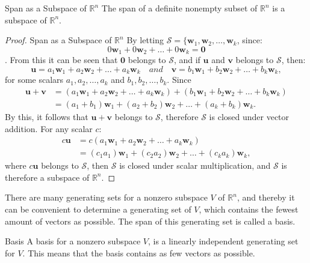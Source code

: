 \begin{theorem}{Span as a Subspace of $\mathbb{R}^n$}
The span of a definite nonempty subset of $\mathbb{R}^n$ is a subspace of $\mathbb{R}^n$.
\cite[231]{LiAl}
\end{theorem}

\begin{proof}{Span as a Subspace of $\mathbb{R}^n$}
    By letting $\mathcal{S} = \{\mathbf{w}_1, \mathbf{w}_2, \hdots, \mathbf{w}_k$, since:
    $$0\mathbf{w}_1 + 0\mathbf{w}_2 + \hdots + 0\mathbf{w}_k = \mathbf{0}$$.
    From this it can be seen that $\mathbf{0}$ belongs to $\mathcal{S}$, and if $\mathbf{u}$ and $\mathbf{v}$ belongs to $\mathcal{S}$, then:
    $$\mathbf{u} = a_1\mathbf{w}_1 + a_2 \mathbf{w}_2 + \hdots + a_k\mathbf{w}_k \quad and \quad \mathbf{v} = b_1\mathbf{w}_1 + b_2 \mathbf{w}_2 + \hdots + b_k\mathbf{w}_k,$$
    for some scalars $a_1, a_2, \hdots, a_k$ and $b_1, b_2, \hdots, b_k$. Since 
    \begin{align*}
     \mathbf{u}+\mathbf{v} &= (a_1\mathbf{w}_1 + a_2 \mathbf{w}_2 + \hdots + a_k\mathbf{w}_k) + (b_1\mathbf{w}_1 + b_2 \mathbf{w}_2 + \hdots + b_k\mathbf{w}_k)\\ 
     &= (a_1+b_1)\mathbf{w}_1 + (a_2+b_2)\mathbf{w}_2 + \hdots + (a_k+b_k)\mathbf{w}_k.
     \end{align*}
     By this, it follows that $\mathbf{u}+\mathbf{v}$ belongs to $\mathcal{S}$, therefore $\mathcal{S}$ is closed under vector addition. For any scalar $c$:
     \begin{align*}
         c\mathbf{u} &= c(a_1\mathbf{w}_1 + a_2 \mathbf{w}_2 + \hdots + a_k\mathbf{w}_k)\\
         &=(c_1a_1)\mathbf{w}_1 + (c_2a_2)\mathbf{w}_2 + \hdots + (c_ka_k)\mathbf{w}_k,
     \end{align*}
     where $c\mathbf{u}$ belongs to $\mathcal{S}$, then $\mathcal{S}$ is closed under scalar multiplication, and $\mathcal{S}$ is therefore a subspace of $\mathbb{R}^n$. \qedsymbol
\end{proof}
There are many generating sets for a nonzero subspace $V$ of $\mathbb{R}^n$, and thereby it can be convenient to determine a generating set of $V$, which contains the fewest amount of vectors as possible. The span of this generating set is called a basis.

\begin{definition}{Basis}
A basis for a nonzero subspace $V$, is a linearly independent generating set for $V$. This means that the basis contains as few vectors as possible.
\end{definition}

